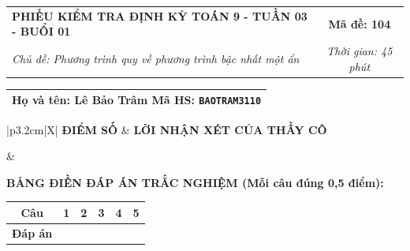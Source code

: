 \documentclass[12pt,a4paper]{article}
\begin{document}
\newpage


\noindent
\begin{tabularx}{\linewidth}{|X|c|}
\hline
\textbf{PHIẾU KIỂM TRA ĐỊNH KỲ TOÁN 9 - TUẦN 03 - BUỔI 01} & \textbf{Mã đề: 104} \\
\textit{Chủ đề: Phương trình quy về phương trình bậc nhất một ẩn} & \textit{Thời gian: 45 phút} \\
\hline
\end{tabularx}

\vspace{1mm}

\noindent
\begin{tabularx}{\linewidth}{|X|}
\hline
\rule[-2mm]{0pt}{7.5mm}\textbf{Họ và tên:} \textbf{\large Lê Bảo Trâm} \hfill \textbf{Mã HS:} \texttt{BAOTRAM3110} \quad \\
\hline
\end{tabularx}

\vspace{1mm}

\noindent
\begin{tabularx}{\linewidth}{|p{3.2cm}|X|}
\hline
\centering\textbf{ĐIỂM SỐ} & \centering\textbf{LỜI NHẬN XÉT CỦA THẦY CÔ} \tabularnewline
\hline
\rule{0pt}{1.3cm} & \tabularnewline
\hline
\end{tabularx}

\vspace{1.2mm}

\noindent\textbf{BẢNG ĐIỀN ĐÁP ÁN TRẮC NGHIỆM (Mỗi câu đúng 0,5 điểm):}
\vspace{0.8mm}

\noindent
\renewcommand{\arraystretch}{1.35}
\begin{tabularx}{\linewidth}{|c|*{5}{>{\centering\arraybackslash}X|}}
\hline
\textbf{Câu} & \textbf{1} & \textbf{2} & \textbf{3} & \textbf{4} & \textbf{5} \\
\hline
\textbf{Đáp án} & & & & & \\
\hline
\end{tabularx}
\renewcommand{\arraystretch}{1.0}

\vspace{1.5mm}
\end{document}

